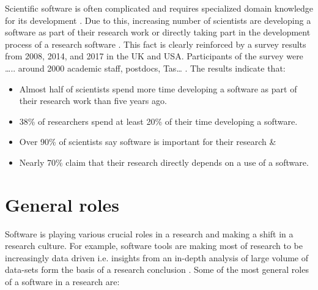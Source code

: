 Scientific software is often complicated and requires specialized domain knowledge for its development \citep{wilson2014best}. Due to this, increasing number of scientists are developing a software as part of their research work or directly taking part in the development process of a research software \citep{jimenez2017four, kanewala2014testing}. This fact is clearly reinforced by a  survey results  from 2008, 2014, and 2017  in the \ac{UK} and \ac{USA}. Participants of the survey were ….. around 2000 academic staff, postdocs, Tas… \citep{merali2010computational, hettrick2014uk, nangia2017track}.  The results indicate that:


\begin{itemize}%
	\item Almost half of scientists spend more time developing a software as part of their research work than five years ago.
	\item 38\% of researchers spend at least 20\% of their time developing a software.
	\item Over 90\% of scientists say software is important for their research \&
	\item Nearly 70\% claim that their research directly depends on a use of a software.  

\end{itemize}




\section{General roles}
\label{subsec:background:first_section:first_subsection}

Software is playing various crucial roles in a research and making a shift in a research culture. For example, software tools are making most of research to be increasingly data driven i.e. insights from an in-depth analysis of large volume of data-sets form the basis of a research conclusion \citep{goble2014better, jay2020software}. Some of the most general roles of a software in a research are:

